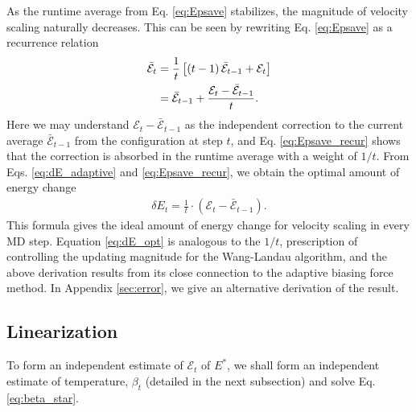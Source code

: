 \documentclass[reprint]{revtex4-1}
\begin{document}
As the runtime average from Eq. \eqref{eq:Epsave}
stabilizes, the magnitude of velocity scaling
naturally decreases.
%
This can be seen by rewriting Eq. \eqref{eq:Epsave}
as a recurrence relation
%
\begin{align}
  \bar{\mathcal E}_t
  &=
  \frac{1}{t}
  \left[
    (t - 1) \, \bar{\mathcal E}_{t - 1}
    + \mathcal E_t
  \right]
  \notag \\
  &=
  \bar{\mathcal E}_{t - 1}
  +
  \frac{
    \mathcal E_t - \bar{\mathcal E}_{t - 1}
  }
  {
    t
  }
  .
\label{eq:Epsave_recur}
\end{align}
%
Here we may understand $\mathcal E_t - \bar{\mathcal E}_{t - 1}$
as the independent correction
to the current average $\bar{\mathcal E}_{t - 1}$
from the configuration at step $t$,
and Eq. \eqref{eq:Epsave_recur} shows that
the correction is absorbed in the runtime average
with a weight of $1/t$.
%
From Eqs. \eqref{eq:dE_adaptive} and \eqref{eq:Epsave_recur},
we obtain the optimal amount of energy change
\begin{align}
  \delta E_t
  =
  \frac{ 1 } { t }
  \cdot
  \left( \mathcal E_t - \bar{\mathcal E}_{t - 1} \right)
  .
  \label{eq:dE_opt}
\end{align}
%
This formula gives the ideal amount of energy change for velocity scaling
in every MD step.
%
Equation \eqref{eq:dE_opt} is analogous to the $1/t$, prescription\cite{
  belardinelli2007, belardinelli2007jcp, belardinelli2008,
  zhou2005, zhou2008, morozov2007}
of controlling the updating magnitude
for the Wang-Landau algorithm\cite{wang2001, wang2001pre},
and the above derivation results from its close connection\cite{
  marsili2006, barducci2008}
to the adaptive biasing force method\cite{darve2001, darve2008}.
%
In Appendix \ref{sec:error}, we give an alternative derivation of the result.



\subsection{Linearization}



To form an independent estimate of
$\mathcal E_t$ of $E^*$,
%
we shall form
an independent estimate of temperature, $\beta_t$
(detailed in the next subsection)
and solve Eq. \eqref{eq:beta_star}.
\end{document}
